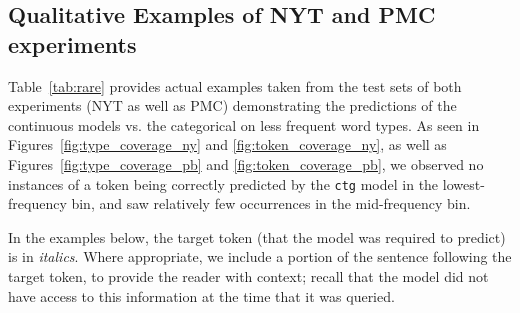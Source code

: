 \documentclass[11pt,a4paper]{article}
\begin{document}
\subsection{Qualitative Examples of NYT and PMC experiments}\label{qualit}

Table~\ref{tab:rare} provides actual examples taken from the test sets of both experiments (NYT as well as PMC) demonstrating the predictions of the continuous models vs. the categorical on less frequent word types.
As seen in Figures~\ref{fig:type_coverage_ny} and \ref{fig:token_coverage_ny}, as well as Figures~\ref{fig:type_coverage_pb} and \ref{fig:token_coverage_pb}, we observed no instances of a token being correctly predicted by the {\tt ctg} model in the lowest-frequency bin, and saw relatively few occurrences in the mid-frequency bin. 

In the examples below, the target token (that the model was required to predict) is in \textit{italics}. Where appropriate, we include a portion of the sentence following the target token, to provide the reader with context; recall that the model did not have access to this information at the time that it was queried.
\end{document}

